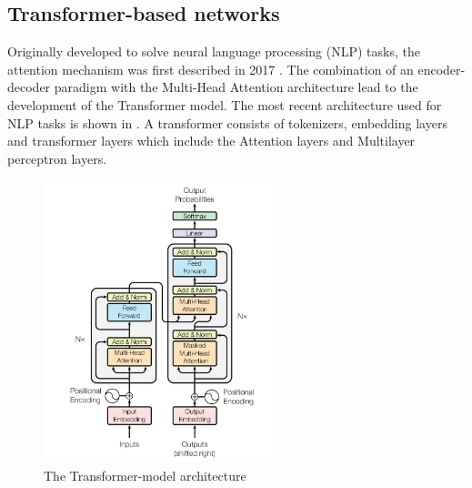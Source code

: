    

\subsection{Transformer-based networks}

Originally developed to solve neural language processing (NLP) tasks, the attention mechanism was first described in 2017 \cite{vaswani_attention_2023}.
The combination of an encoder-decoder paradigm with the Multi-Head Attention architecture lead to the development of the Transformer model. The most recent architecture used for NLP tasks is shown in .
A transformer consists of tokenizers, embedding layers and transformer layers which include the Attention layers and Multilayer perceptron layers.

\begin{figure}[H]
    \centering
    \includegraphics[width=0.6\textwidth]{Figures/Transformer.png}
    \caption{The Transformer-model architecture \cite{vaswani_attention_2023}}
    \label{fig:transformer_model}
\end{figure}

